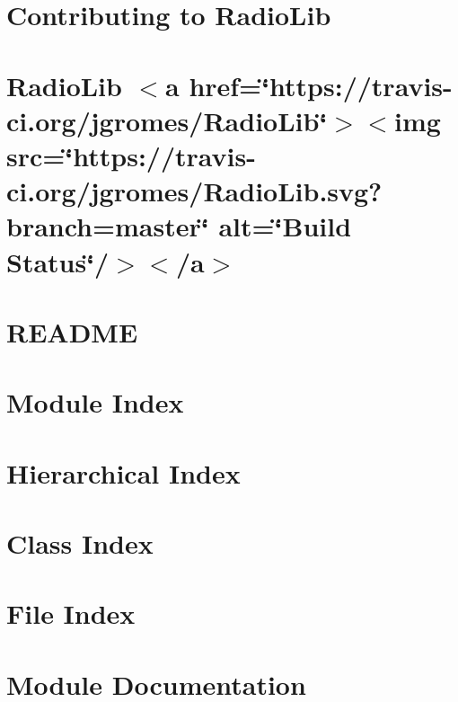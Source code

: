 \let\mypdfximage\pdfximage\def\pdfximage{\immediate\mypdfximage}\documentclass[twoside]{book}
\newcommand{\+}{\discretionary{\mbox{\scriptsize$\hookleftarrow$}}{}{}}
\begin{document}
\chapter{Contributing to Radio\+Lib}
\label{md__libraries__radio_lib__c_o_n_t_r_i_b_u_t_i_n_g}

\chapter{Radio\+Lib $<$a href=\char`\"{}https\+://travis-\/ci.\+org/jgromes/\+Radio\+Lib\char`\"{}$>$$<$img src=\char`\"{}https\+://travis-\/ci.\+org/jgromes/\+Radio\+Lib.\+svg?branch=master\char`\"{} alt=\char`\"{}\+Build Status\char`\"{}/$>$$<$/a$>$}
\label{md__libraries__radio_lib__r_e_a_d_m_e}

\chapter{R\+E\+A\+D\+ME}
\label{md__r_e_a_d_m_e}

\chapter{Module Index}

\chapter{Hierarchical Index}

\chapter{Class Index}

\chapter{File Index}

\chapter{Module Documentation}



\end{document}
